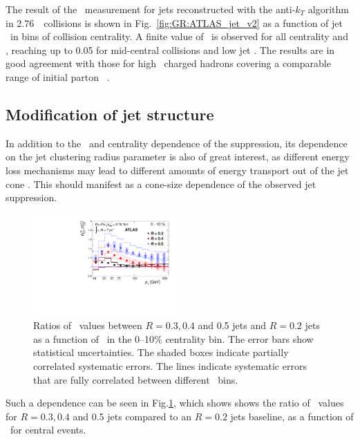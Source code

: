 The result of the \vtwo\ measurement for jets reconstructed with the anti-$k_T$ 
algorithm in 2.76\TeV\ \PbPb\ collisions is shown in Fig.~\ref{fig:GR:ATLAS_jet_v2}
as a function of jet \pT\ in bins of collision centrality. A finite
value of \vtwo\ is observed for all centrality and \pT, reaching up to 0.05 for
mid-central collisions and low jet \pT. The results are in good agreement
with those for high \pT\ charged hadrons covering a comparable range
of initial parton \pT~\cite{Chatrchyan:2012xq}.

\subsection{Modification of jet structure}

In addition to the \pT\ and centrality dependence of the suppression, its dependence on the 
jet clustering radius parameter is also of great interest, as different energy loss 
mechanisms may lead to different amounts of energy transport out of the jet cone
\cite{Vitev:2008rz, Vitev:2009rd,He:2011pd}. This should manifest as a cone-size 
dependence of the observed jet suppression.
\begin{figure}[!h]
\begin{center}
\includegraphics[width=0.49\textwidth]{jetfigures/ATLAS_jetRCP_size.pdf}
\caption{
Ratios of \Rcp\ values between $R = 0.3, 0.4$ and 0.5 jets and $R =
0.2$ jets as a function of \pT\ in the 0--10\% centrality bin. The
error bars show statistical uncertainties. The shaded boxes
indicate partially correlated systematic errors. The lines indicate
systematic errors that are fully correlated between different \pT\ bins.
}
\label{fig:GR:ATLAS_jetRCP_size}
\end{center}
\end{figure}

Such a dependence can be seen in Fig.\ref{fig:GR:ATLAS_jetRCP_size}, which shows 
shows the ratio of \Rcp\ values for $R = 0.3, 0.4$ and 0.5 jets compared
to an $R = 0.2$ jets baseline, as a function of \pT\ for central events.

